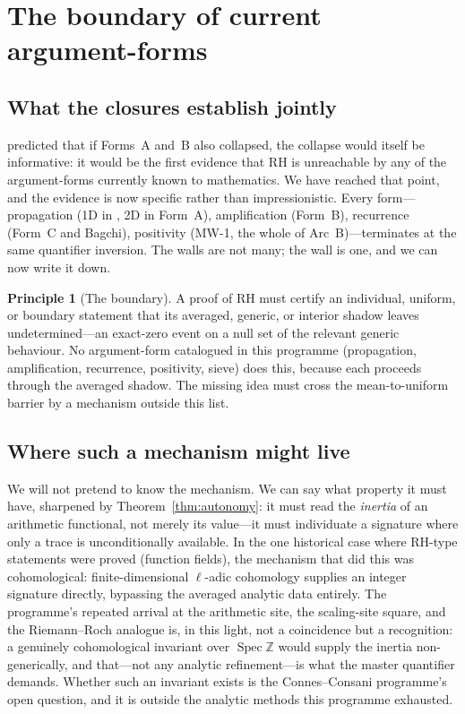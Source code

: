 \documentclass[11pt]{amsart}
\theoremstyle{definition}
\newtheorem{principle}[theorem]{Principle}
\theoremstyle{remark}
\newcommand{\bbZ}{\mathbb{Z}}
\DeclareMathOperator{\Spec}{Spec}
\begin{document}
\section{The boundary of current argument-forms}\label{sec:boundary}

\subsection{What the closures establish jointly}
\cite{P41} predicted that if Forms~A and~B also collapsed, the collapse would
itself be informative: it would be the first evidence that RH is unreachable
by any of the argument-forms currently known to mathematics. We have reached
that point, and the evidence is now specific rather than impressionistic.
Every form---propagation (1D in \cite{P41}, 2D in Form~A), amplification
(Form~B), recurrence (Form~C and Bagchi), positivity (MW-1, the whole of
Arc~B)---terminates at the same quantifier inversion. The walls are not many;
the wall is one, and we can now write it down.

\begin{principle}[The boundary]\label{prin:boundary}
A proof of RH must certify an individual, uniform, or boundary statement that
its averaged, generic, or interior shadow leaves undetermined---an exact-zero
event on a null set of the relevant generic behaviour. No argument-form
catalogued in this programme (propagation, amplification, recurrence,
positivity, sieve) does this, because each proceeds through the averaged
shadow. The missing idea must cross the mean-to-uniform barrier by a mechanism
outside this list.
\end{principle}

\subsection{Where such a mechanism might live}
We will not pretend to know the mechanism. We can say what property it must
have, sharpened by Theorem~\ref{thm:autonomy}: it must read the
\emph{inertia} of an arithmetic functional, not merely its value---it must
individuate a signature where only a trace is unconditionally available. In
the one historical case where RH-type statements were proved (function
fields), the mechanism that did this was cohomological: finite-dimensional
$\ell$-adic cohomology supplies an integer signature directly, bypassing the
averaged analytic data entirely. The programme's repeated arrival at the
arithmetic site, the scaling-site square, and the Riemann--Roch analogue
\cite[MW-5]{P40} is, in this light, not a coincidence but a recognition: a
genuinely cohomological invariant over $\Spec\bbZ$ would supply the inertia
non-generically, and that---not any analytic refinement---is what the master
quantifier demands. Whether such an invariant exists is the Connes--Consani
programme's open question, and it is outside the analytic methods this
programme exhausted.
\end{document}
